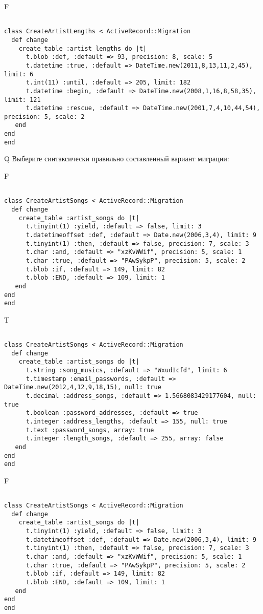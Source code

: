 F
\begin{verbatim}
		
class CreateArtistLengths < ActiveRecord::Migration 
  def change 
    create_table :artist_lengths do |t| 
      t.blob :def, :default => 93, precision: 8, scale: 5
      t.datetime :true, :default => DateTime.new(2011,8,13,11,2,45), limit: 6
      t.int(11) :until, :default => 205, limit: 182
      t.datetime :begin, :default => DateTime.new(2008,1,16,8,58,35), limit: 121
      t.datetime :rescue, :default => DateTime.new(2001,7,4,10,44,54), precision: 5, scale: 2
   end
end
end
\end{verbatim}

Q
Выберите синтаксически правильно составленный вариант миграции:

F
\begin{verbatim}
		
class CreateArtistSongs < ActiveRecord::Migration 
  def change 
    create_table :artist_songs do |t| 
      t.tinyint(1) :yield, :default => false, limit: 3
      t.datetimeoffset :def, :default => Date.new(2006,3,4), limit: 9
      t.tinyint(1) :then, :default => false, precision: 7, scale: 3
      t.char :and, :default => "xzKvWWif", precision: 5, scale: 1
      t.char :true, :default => "PAwSykpP", precision: 5, scale: 2
      t.blob :if, :default => 149, limit: 82
      t.blob :END, :default => 109, limit: 1
   end
end
end
\end{verbatim}

T
\begin{verbatim}
		
class CreateArtistSongs < ActiveRecord::Migration 
  def change 
    create_table :artist_songs do |t| 
      t.string :song_musics, :default => "WxudIcfd", limit: 6
      t.timestamp :email_passwords, :default => DateTime.new(2012,4,12,9,18,15), null: true
      t.decimal :address_songs, :default => 1.5668083429177604, null: true
      t.boolean :password_addresses, :default => true
      t.integer :address_lengths, :default => 155, null: true
      t.text :password_songs, array: true
      t.integer :length_songs, :default => 255, array: false
   end
end
end
\end{verbatim}

F
\begin{verbatim}
		
class CreateArtistSongs < ActiveRecord::Migration 
  def change 
    create_table :artist_songs do |t| 
      t.tinyint(1) :yield, :default => false, limit: 3
      t.datetimeoffset :def, :default => Date.new(2006,3,4), limit: 9
      t.tinyint(1) :then, :default => false, precision: 7, scale: 3
      t.char :and, :default => "xzKvWWif", precision: 5, scale: 1
      t.char :true, :default => "PAwSykpP", precision: 5, scale: 2
      t.blob :if, :default => 149, limit: 82
      t.blob :END, :default => 109, limit: 1
   end
end
end
\end{verbatim}

